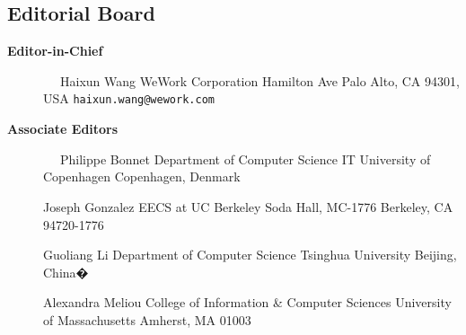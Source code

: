 \documentclass[10pt,twocolumn]{article}
\begin{document}
\pagestyle{empty}

\subsection*{Editorial Board}

\begin{description}
\item[{\bf Editor-in-Chief}]
\verb-  -                      \newline
Haixun Wang                 \newline
WeWork Corporation              Hamilton Ave     \newline
Palo Alto, CA 94301, USA         \newline
\verb+haixun.wang@wework.com+     
\vspace{-.2cm}

\item[{\bf Associate Editors}] 
\verb-  -                     \newline
Philippe Bonnet \newline
Department of Computer Science \newline
IT University of Copenhagen  Copenhagen, Denmark \newline

\vspace{-.4cm}

Joseph Gonzalez \newline
EECS at UC Berkeley Soda Hall, MC-1776 \newline
Berkeley, CA 94720-1776 \newline

\vspace{-.4cm}

Guoliang Li\newline
Department of Computer Science \newline 
Tsinghua University\newline
Beijing, China�\newline
\vspace{-.2cm}

Alexandra Meliou\newline
College of Information \& Computer Sciences \newline 
University of  Massachusetts \newline
Amherst, MA 01003 \newline
\vspace{-.2cm}



\end{description}
\end{document}
